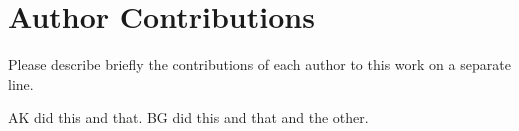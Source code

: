 \section{Author Contributions}


Please describe briefly the contributions of each author to this work on a separate line. 

AK did this and that.
BG did this and that and the other. 

